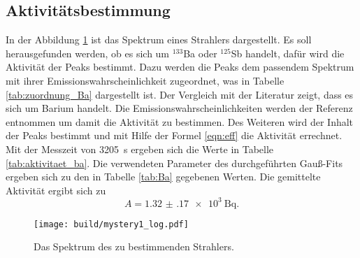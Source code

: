 \subsection{Aktivitätsbestimmung}
\label{sec:Aktiv}
In der Abbildung \ref{fig:mystery1} ist das Spektrum eines Strahlers dargestellt. Es soll herausgefunden werden,
ob es sich um ${}^{133}$Ba oder ${}^{125}$Sb handelt, dafür wird die Aktivität der Peaks bestimmt. Dazu werden
die Peaks dem passendem Spektrum mit ihrer Emissionswahrscheinlichkeit zugeordnet, was in Tabelle \ref{tab:zuordnung_Ba}
dargestellt ist. Der Vergleich mit der Literatur \cite{referenz1} zeigt, dass es sich um Barium handelt. 
Die Emissionswahrscheinlichkeiten werden der Referenz \cite{referenz1} entnommen um damit die Aktivität zu bestimmen. 
Des Weiteren wird der Inhalt der Peaks bestimmt und mit Hilfe der Formel 
\ref{eqn:eff} die Aktivität errechnet. Mit der Messzeit von \SI{3205}{\second} ergeben sich die Werte in Tabelle 
\ref{tab:aktivitaet_ba}. Die verwendeten Parameter des durchgeführten Gauß-Fits ergeben sich zu den in Tabelle \ref{tab:Ba} 
gegebenen Werten. Die gemittelte Aktivität ergibt sich zu
\begin{equation*}
  A = \SI{1.32(17)e3}{\becquerel}.
\end{equation*}
 


\begin{figure}[htb]
 \centering
 \texttt{[image: build/mystery1\_log.pdf]}
 \caption{Das Spektrum des zu bestimmenden Strahlers.}
 \label{fig:mystery1}
\end{figure}
\FloatBarrier




